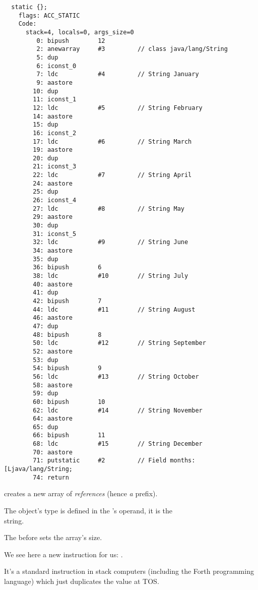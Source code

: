 \begin{lstlisting}
  static {};
    flags: ACC_STATIC
    Code:
      stack=4, locals=0, args_size=0
         0: bipush        12
         2: anewarray     #3         // class java/lang/String
         5: dup           
         6: iconst_0      
         7: ldc           #4         // String January
         9: aastore       
        10: dup           
        11: iconst_1      
        12: ldc           #5         // String February
        14: aastore       
        15: dup           
        16: iconst_2      
        17: ldc           #6         // String March
        19: aastore       
        20: dup           
        21: iconst_3      
        22: ldc           #7         // String April
        24: aastore       
        25: dup           
        26: iconst_4      
        27: ldc           #8         // String May
        29: aastore       
        30: dup           
        31: iconst_5      
        32: ldc           #9         // String June
        34: aastore       
        35: dup           
        36: bipush        6
        38: ldc           #10        // String July
        40: aastore       
        41: dup           
        42: bipush        7
        44: ldc           #11        // String August
        46: aastore       
        47: dup           
        48: bipush        8
        50: ldc           #12        // String September
        52: aastore       
        53: dup           
        54: bipush        9
        56: ldc           #13        // String October
        58: aastore       
        59: dup           
        60: bipush        10
        62: ldc           #14        // String November
        64: aastore       
        65: dup           
        66: bipush        11
        68: ldc           #15        // String December
        70: aastore       
        71: putstatic     #2         // Field months:[Ljava/lang/String;
        74: return        
\end{lstlisting}

 creates a new array of \emph{references} (hence \emph{a} prefix).

The object's type is defined in the 's operand, it is the \\
 string.

The  before  sets the array's size.

We see here a new instruction for us: .


It's a standard instruction in stack computers (including the Forth programming language) 
which just duplicates the value at \ac{TOS}.

